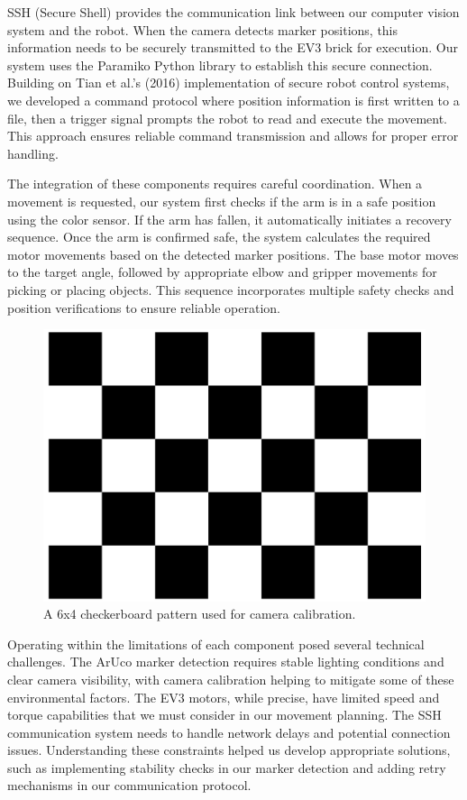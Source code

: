 \documentclass[10pt,twocolumn]{article}
\begin{document}
SSH (Secure Shell) provides the communication link between our computer vision system and the robot. When the camera detects marker positions, this information needs to be securely transmitted to the EV3 brick for execution. Our system uses the Paramiko Python library to establish this secure connection. Building on Tian et al.'s (2016) \cite{tian2016development} implementation of secure robot control systems, we developed a command protocol where position information is first written to a file, then a trigger signal prompts the robot to read and execute the movement. This approach ensures reliable command transmission and allows for proper error handling.

The integration of these components requires careful coordination. When a movement is requested, our system first checks if the arm is in a safe position using the color sensor. If the arm has fallen, it automatically initiates a recovery sequence. Once the arm is confirmed safe, the system calculates the required motor movements based on the detected marker positions. The base motor moves to the target angle, followed by appropriate elbow and gripper movements for picking or placing objects. This sequence incorporates multiple safety checks and position verifications to ensure reliable operation.

\begin{figure}
    \centering
    \includegraphics[width=.95\linewidth]{checkerboard_pattern}
    \caption{
        A 6x4 checkerboard pattern used for camera calibration.
    }
    \label{fig:second-page}
\end{figure}

Operating within the limitations of each component posed several technical challenges. The ArUco marker detection requires stable lighting conditions and clear camera visibility, with camera calibration helping to mitigate some of these environmental factors. The EV3 motors, while precise, have limited speed and torque capabilities that we must consider in our movement planning. The SSH communication system needs to handle network delays and potential connection issues. Understanding these constraints helped us develop appropriate solutions, such as implementing stability checks in our marker detection and adding retry mechanisms in our communication protocol.
\end{document}
